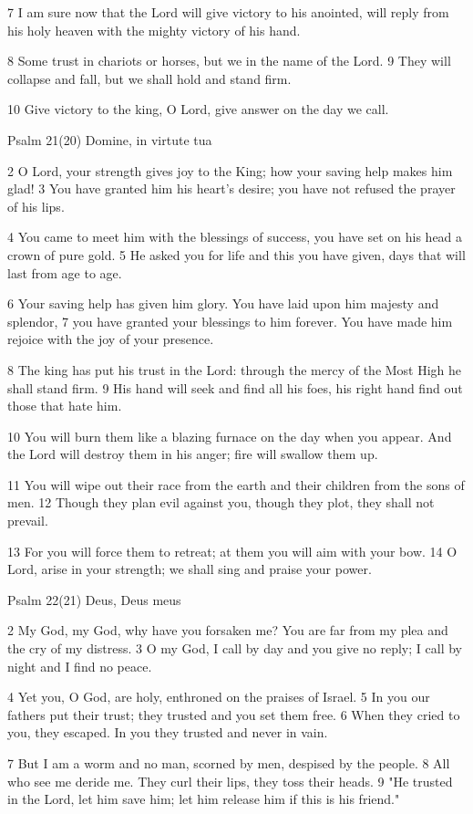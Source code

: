 7 I am sure now that the Lord
will give victory to his anointed,
will reply from his holy heaven
with the mighty victory of his hand.

8 Some trust in chariots or horses,
but we in the name of the Lord.
9 They will collapse and fall,
but we shall hold and stand firm.

10 Give victory to the king, O Lord,
give answer on the day we call.


Psalm 21(20) Domine, in virtute tua

2 O Lord, your strength gives joy to the King;
how your saving help makes him glad!
3 You have granted him his heart's desire;
you have not refused the prayer of his lips.

4 You came to meet him with the blessings of success,
you have set on his head a crown of pure gold.
5 He asked you for life and this you have given,
days that will last from age to age.

6 Your saving help has given him glory.
You have laid upon him majesty and splendor,
7 you have granted your blessings to him forever.
You have made him rejoice with the joy of your presence.

8 The king has put his trust in the Lord:
through the mercy of the Most High he shall stand firm.
9 His hand will seek and find all his foes,
his right hand find out those that hate him.

10 You will burn them like a blazing furnace
on the day when you appear.
And the Lord will destroy them in his anger;
fire will swallow them up.

11 You will wipe out their race from the earth
and their children from the sons of men.
12 Though they plan evil against you,
though they plot, they shall not prevail.

13 For you will force them to retreat;
at them you will aim with your bow.
14 O Lord, arise in your strength;
we shall sing and praise your power.


Psalm 22(21) Deus, Deus meus

2 My God, my God, why have you forsaken me?
You are far from my plea and the cry of my distress.
3 O my God, I call by day and you give no reply;
I call by night and I find no peace.

4 Yet you, O God, are holy,
enthroned on the praises of Israel.
5 In you our fathers put their trust;
they trusted and you set them free.
6 When they cried to you, they escaped.
In you they trusted and never in vain.

7 But I am a worm and no man,
scorned by men, despised by the people.
8 All who see me deride me.
They curl their lips, they toss their heads.
9 "He trusted in the Lord, let him save him;
let him release him if this is his friend."

